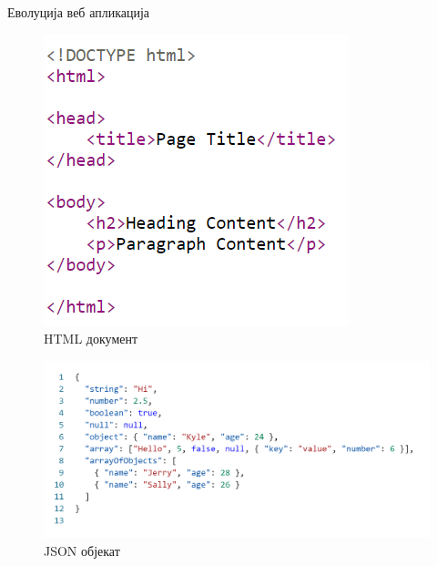 \documentclass{beamer}
\begin{document}
\begin{frame}[allowframebreaks]{Еволуција веб апликација}
        \begin{figure}
            \centering
            \includegraphics[width=\textwidth,height=0.7\textheight,keepaspectratio]{images/html.png}
            \caption{HTML документ}
            \label{fig:html}
        \end{figure}
        
        \framebreak
        
        \begin{figure}
            \centering
            \includegraphics[width=\textwidth,height=0.7\textheight,keepaspectratio]{images/json.png}
            \caption{JSON објекат}
            \label{fig:json}
        \end{figure}
    \end{frame}
    
\end{document}
